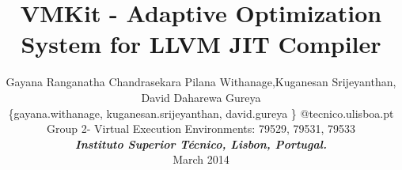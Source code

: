 \documentclass[times, 10pt,twocolumn]{article}
\begin{document}
\title{VMKit - Adaptive Optimization System  for LLVM JIT Compiler}

\author{
Gayana Ranganatha Chandrasekara Pilana Withanage,Kuganesan Srijeyanthan, David Daharewa Gureya\\
\{gayana.withanage, kuganesan.srijeyanthan, david.gureya \} @tecnico.ulisboa.pt\\
Group 2- Virtual Execution Environments: 79529, 79531, 79533\\
\textbf{\textit{Instituto Superior T\'{e}cnico, Lisbon, Portugal.}}\\
March 2014\\
}

\maketitle
\thispagestyle{empty}













\end{document}
